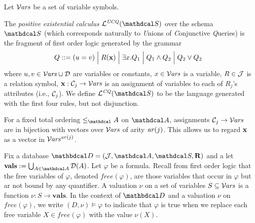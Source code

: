 \documentclass[the-pdg-manual.tex]{subfiles}
\begin{document}
Let $\mathcal V\kern-.65pt\mathit{ars}$ be a set of variable symbols.

\begin{defn}[CQ,UCQ]
	The \emph{positive existential calculus} $\lang{UCQ}(\Sch)$ over the schema $\Sch$ (which corresponds naturally to \emph Unions of \emph Conjunctive \emph Queries) is the fragment of first order logic generated by the grammar
	\begin{align*}
		 Q ::= (u=v) \mathrel{\Big|} R(\mathbf x)  \mathrel{\Big|} \exists x. Q_1 \mathrel{\Big|} Q_1 \land Q_2 \mathrel{\Big|} Q_2 \lor Q_2  
	\end{align*}
	where $u,v \in \mathcal V\kern-.65pt\mathit{ars} \cup {\mathcal D}$ are variables
	or constants, $x \in \mathcal V\kern-.65pt\mathit{ars}$ is a variable,
	$R \in \mathcal J$ is a relation symbol, $\mathbf x  : \mathcal C_j \to {\mathcal V\kern-.65pt\mathit{ars}}$ is an assignment of variables to each of $R_j$'s attributes (i.e., $\mathcal C_j$). We define $\lang{CQ}(\Sch)$ to be the language generated with the first four rules, but not disjunction.
\end{defn}
	

\begin{inactive}
	For a fixed total ordering $\leq_\Attrs$ on $\Attrs$, assignments $\mathcal C_j \to \mathcal V\kern-.65pt\mathit{ars}$ are in bijection with vectors over $\mathcal V\kern-.65pt\mathit{ars}$ of arity $\mathit{ar}(j)$. This allows us to regard $\mathbf x$ as a vector in $\mathcal V\kern-.65pt\mathit{ars}^{\mathit{ar}(j)}$. 
\end{inactive}
Fix a database $\D = (\Idx,\Attrs,\Sch,\Rels)$ and a let $\vals := \bigcup_{A \in \Attrs}\Doms(A)$. Let $\varphi$ be a formula. 
Recall from first order logic that the free variables of $\varphi$, denoted $\mathit{free}(\varphi)$, are those variables that occur in $\varphi$ but ar not bound by any quantifier.
A valuation $\nu$ on a set of variables $S \subseteq \mathcal V\kern-.65pt\mathit{ars}$ is a function $\nu: S \to \mathbf{vals}$. 
In the context of $\D$ and a valuation $\nu$ on $\mathit{free}(\varphi)$, we write $(D,\nu) \models \varphi$ to indicate that $\varphi$ is true when we replace each free variable $X \in \mathit{free}(\varphi)$ with the value $\nu(X)$. %
\end{document}

